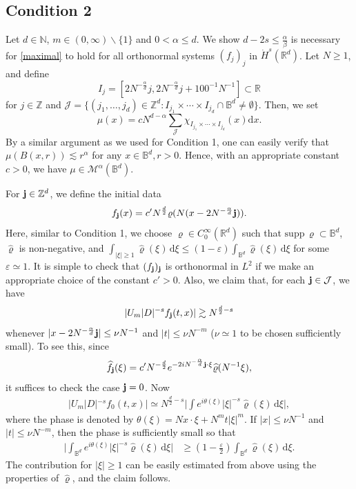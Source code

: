 \documentclass[a4paper]{amsart}
\numberwithin{equation}{section}%
\theoremstyle{plain}%
\theoremstyle{definition}
\theoremstyle{remark}%
\def\supp{\mathrm{supp\,}}
\def\d{\mathrm{d}}
\newcommand{\R}{{\mathbb R}}
\newcommand{\Z}{{\mathbb Z}}
\newcommand{\J}{\mathcal{J}}
\begin{document}
\subsection*{Condition 2} Let $d\in \mathbb N$,  $m\in(0,\infty)\backslash\{1\}$ and $0<\alpha\leq d$. We show $d-2s\leq \frac\alpha\beta$ is necessary for \eqref{maximal} to hold for all orthonormal systems $(f_j)_j$ in $\dot{H}^s(\mathbb R^d)$. 
Let $N \geq1$, and define
\[
    I_j
    =
    [2N^{-\frac{\alpha}{d}}j, 2N^{-\frac{\alpha}{d}}j+100^{-1}N^{-1}]\subset \mathbb R
\]
for $j \in \Z$ and $\J=\{(j_1,\dots,j_d)\in\mathbb Z^d: I_{j_1}\times\cdots\times I_{j_d}\cap\mathbb B^d\not=\emptyset\}$. Then, we set 
\[
    \mu(x)
    =
    cN^{d-\alpha}\sum_{\J}\chi_{I_{j_1}\times\cdots\times I_{j_d}}(x)\d x.
\]
By a similar argument as we used for Condition 1, one can easily verify that $\mu(B(x,r)) \lesssim r^\alpha$ for any $x \in \mathbb{B}^d, r>0$. Hence, with an appropriate constant $c>0$, we have $\mu\in\mathcal M^\alpha(\mathbb B^d)$.

For ${\bf{j}} \in \Z^d$, we define the initial data
\[
    f_{\bf{j}}(x)
    =
    c' N^\frac d2\varrho(N(x-2N^{-\frac{\alpha}{d}}{\bf{j}})).
\]
Here, similar to Condition 1, we choose $\varrho\in C_0^\infty (\R^d)$ such that $\supp\varrho\subset \mathbb B^d$, $\widehat{\varrho}$ is non-negative, and $\int_{|\xi|\geq 1}\widehat{\varrho}(\xi)\,\d\xi \leq (1 - \varepsilon) \int_{\mathbb B^d}\widehat{\varrho}(\xi)\,\d\xi$ for some $\varepsilon \simeq 1$. It is simple to check that $(f_{\bf{j}})_{\bf{j}}$ is orthonormal in $L^2$ if we make an appropriate choice of the constant $c'>0$. Also, we claim that, for each ${\bf{j}}\in\J$, we have
\[
    |U_m | D|^{-s}f_{\bf{j}}(t,x)|
    \gtrsim
    N^{\frac d2-s}
\]
whenever $|x-2N^{-\frac{\alpha}{d}}{\bf{j}}|\leq \nu N^{-1}$ and $|t| \leq \nu N^{-m}$ ($\nu \simeq 1$ to be chosen sufficiently small). To see this, since
\[
    \widehat{f_{\bf{j}}}(\xi)
    =
    c' N^{-\frac d2}e^{-2iN^{-\frac{\alpha}{d}}{\bf{j}}\cdot\xi}\widehat{\varrho}(N^{-1}\xi),
\]
it suffices to check the case ${\bf{j}}=0$. Now
\begin{align*}
    |U_m | D|^{-s} f_0(t,x)|
    \simeq 
    N^{\frac d2 -s}\bigg|\int e^{i\theta(\xi)}|\xi|^{-s} \widehat{\varrho}(\xi)\,\d\xi\bigg|,
\end{align*}
where the phase is denoted by $\theta(\xi)=Nx\cdot \xi+N^mt|\xi|^m$. If $|x|\leq \nu N^{-1}$ and $|t|\leq \nu N^{-m}$, then the phase is sufficiently small so that 
\begin{align*}
\bigg|\int_{\mathbb{B}^d} e^{i\theta(\xi)}|\xi|^{-s} \widehat{\varrho}(\xi)\,\d\xi\bigg|
&\geq
(1 - \tfrac{\varepsilon}{2}) \int_{\mathbb{B}^d} \widehat{\varrho}(\xi)\,\d\xi.
\end{align*}
The contribution for $|\xi| \geq 1$ can be easily estimated from above using the properties of $\widehat{\varrho}$, and the claim follows.
\end{document}
